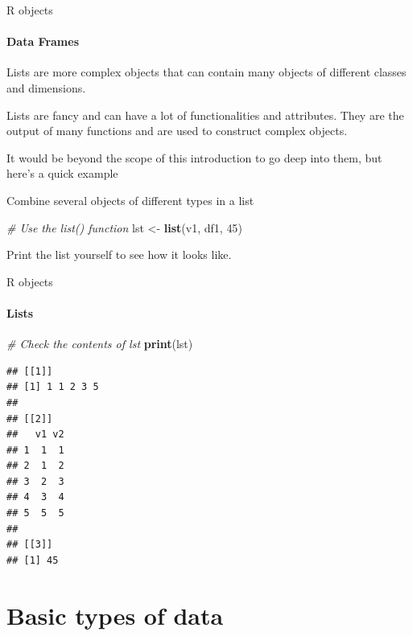 \documentclass[ignorenonframetext,]{beamer}
\newenvironment{Shaded}{\begin{snugshade}}{\end{snugshade}}
\newcommand{\KeywordTok}[1]{\textcolor[rgb]{0.13,0.29,0.53}{\textbf{#1}}}
\newcommand{\DecValTok}[1]{\textcolor[rgb]{0.00,0.00,0.81}{#1}}
\newcommand{\StringTok}[1]{\textcolor[rgb]{0.31,0.60,0.02}{#1}}
\newcommand{\CommentTok}[1]{\textcolor[rgb]{0.56,0.35,0.01}{\textit{#1}}}
\newcommand{\NormalTok}[1]{#1}
\begin{document}
\begin{frame}[fragile]{R objects}

\framesubtitle{Data Frames}

Lists are more complex objects that can contain many objects of
different classes and dimensions.

Lists are fancy and can have a lot of functionalities and attributes.
They are the output of many functions and are used to construct complex
objects.

It would be beyond the scope of this introduction to go deep into them,
but here's a quick example

\begin{block}{Combine several objects of different types in a list}

\begin{Shaded}
\begin{Highlighting}[]
\CommentTok{# Use the list() function}
\NormalTok{lst <-}\StringTok{ }\KeywordTok{list}\NormalTok{(v1, df1, }\DecValTok{45}\NormalTok{)}
\end{Highlighting}
\end{Shaded}

Print the list yourself to see how it looks like.

\end{block}

\end{frame}

\begin{frame}[fragile]{R objects}

\framesubtitle{Lists}

\scriptsize

\begin{Shaded}
\begin{Highlighting}[]
\CommentTok{# Check the contents of lst}
\KeywordTok{print}\NormalTok{(lst)}
\end{Highlighting}
\end{Shaded}

\begin{verbatim}
## [[1]]
## [1] 1 1 2 3 5
## 
## [[2]]
##   v1 v2
## 1  1  1
## 2  1  2
## 3  2  3
## 4  3  4
## 5  5  5
## 
## [[3]]
## [1] 45
\end{verbatim}

\end{frame}

\section{Basic types of data}\label{basic-types-of-data}
\end{document}

